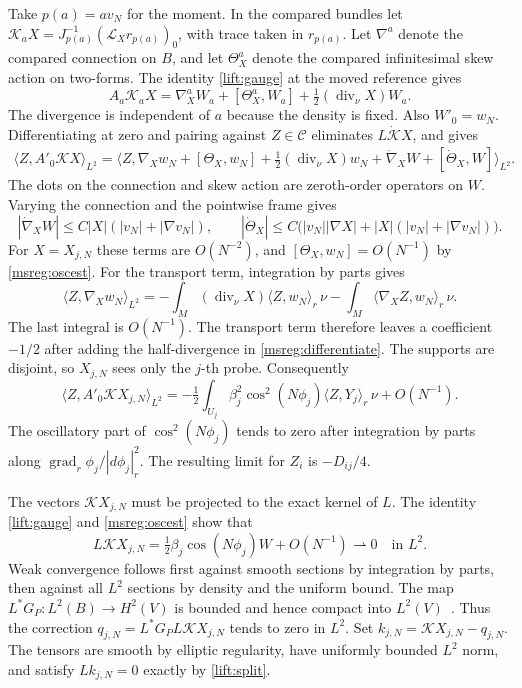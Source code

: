 \documentclass[11pt]{article}
\numberwithin{equation}{section}
\theoremstyle{definition}
\theoremstyle{remark}
\begin{document}
Take \(p(a)=av_N\) for the moment. In the compared bundles let \(\mathcal K_a X=J_{p(a)}^{-1}(\mathcal L_Xr_{p(a)})_0\),
with trace taken in \(r_{p(a)}\). Let \(\nabla^a\) denote the compared connection on \(B\), and
let \(\Theta_X^a\) denote the compared infinitesimal skew action
on two-forms. The identity \eqref{lift:gauge} at the moved
reference gives
\[
 A_a\mathcal K_a X=\nabla_X^a W_a+[\Theta_X^a,W_a]
                         +\tfrac12(\operatorname{div}_\nu X)W_a .
\]
The divergence is independent of \(a\) because the density
is fixed. Also \(W'_0=w_N\). Differentiating at zero and pairing
against \(Z\in\mathcal C\) eliminates \(L\dot{\mathcal K}X\),
and gives
\begin{align}
 \langle Z,A'_0\mathcal KX\rangle_{L^2}
  =\big\langle Z,\nabla_X w_N+[\Theta_X,w_N]
          +\tfrac12(\operatorname{div}_\nu X)w_N
          +\dot\nabla_X W+[\dot\Theta_X,W]\big\rangle_{L^2}.
 \label{msreg:differentiate}
\end{align}
The dots on the connection and skew action are zeroth-order
operators on \(W\). Varying the connection and the pointwise
frame gives
\[
 |\dot\nabla_X W|\le C |X|(|v_N|+|\nabla v_N|),\qquad
 |\dot\Theta_X|\le C\bigl(|v_N||\nabla X|
                      +|X|(|v_N|+|\nabla v_N|)\bigr).
\]
For \(X=X_{j,N}\) these terms are \(O(N^{-2})\), and
\([\Theta_X,w_N]=O(N^{-1})\) by \eqref{msreg:oscest}.
For the transport term, integration by parts gives
\[
 \langle Z,\nabla_X w_N\rangle_{L^2}
  =-\int_M(\operatorname{div}_\nu X)\langle Z,w_N\rangle_r\,\nu
     -\int_M\langle \nabla_X Z,w_N\rangle_r\,\nu .
\]
The last integral is \(O(N^{-1})\). The transport term
therefore leaves a coefficient \(-1/2\) after adding the
half-divergence in \eqref{msreg:differentiate}. The supports
are disjoint, so \(X_{j,N}\) sees only the \(j\)-th probe.
Consequently
\[
 \langle Z,A'_0\mathcal KX_{j,N}\rangle_{L^2}
 =-\tfrac12\int_{U_j}\beta_j^2\cos^2(N\phi_j)
                       \langle Z,Y_j\rangle_r\,\nu+O(N^{-1}).
\]
The oscillatory part of \(\cos^2(N\phi_j)\) tends to zero
after integration by parts along
\(\operatorname{grad}_r\phi_j/|d\phi_j|_r^2\).
The resulting limit for \(Z_i\) is \(-D_{ij}/4\).

The vectors \(\mathcal K X_{j,N}\) must be projected to the
exact kernel of \(L\). The identity \eqref{lift:gauge} and
\eqref{msreg:oscest} show that
\[
 L\mathcal K X_{j,N}
     =\tfrac12\beta_j\cos(N\phi_j)W+O(N^{-1})
       \rightharpoonup0 \quad\text{in }L^2 .
\]
Weak convergence follows first against smooth sections by
integration by parts, then against all \(L^2\) sections by
density and the uniform bound. The map \(L^*G_P:L^2(B)\to H^2(V)\)
is bounded and hence compact into \(L^2(V)\)~\cite[Theorem 16.10]{Dyatlov2026Elliptic}.
Thus the correction
\(q_{j,N}=L^*G_P L\mathcal K X_{j,N}\) tends to zero in \(L^2\).
Set \(k_{j,N}=\mathcal KX_{j,N}-q_{j,N}\).
The tensors are smooth by elliptic regularity, have uniformly
bounded \(L^2\) norm, and satisfy \(Lk_{j,N}=0\) exactly by
\eqref{lift:split}.
\end{document}
